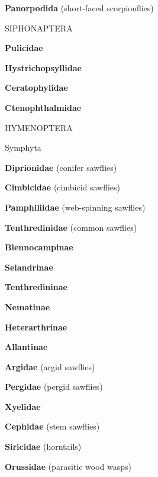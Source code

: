 \documentclass[letterpaper,10pt]{article}
\begin{document}
{\makebox[0.6cm]{}  \textbf{Panorpodida} (short-faced scorpionflies) \par
%
%
%
\makebox[0.0cm]{}  SIPHONAPTERA \par
\makebox[0.6cm]{}  \textbf{Pulicidae} \par
\makebox[0.6cm]{}  \textbf{Hystrichopsyllidae} \par
\makebox[0.6cm]{}  \textbf{Ceratophylidae} \par
\makebox[0.6cm]{}  \textbf{Ctenophthalmidae} \par
%
%
%	
\makebox[0.0cm]{}  HYMENOPTERA\par
\makebox[0.20cm]{}  Symphyta \par
\makebox[0.6cm]{}  \textbf{Diprionidae} (conifer sawflies) \par
\makebox[0.6cm]{}  \textbf{Cimbicidae} (cimbicid sawflies) \par
\makebox[0.6cm]{}  \textbf{Pamphiliidae} (web-spinning sawflies) \par
\makebox[0.6cm]{}  \textbf{Tenthredinidae} (common sawflies) \par
\makebox[0.8cm]{}  \textbf{Blennocampinae} \par
\makebox[0.8cm]{}  \textbf{Selandrinae} \par
\makebox[0.8cm]{}  \textbf{Tenthredininae} \par
\makebox[0.8cm]{}  \textbf{Nematinae} \par
\makebox[0.8cm]{}  \textbf{Heterarthrinae} \par
\makebox[0.8cm]{}  \textbf{Allantinae} \par
\makebox[0.6cm]{}  \textbf{Argidae} (argid sawflies) \par
\makebox[0.6cm]{}  \textbf{Pergidae} (pergid sawflies) \par
\makebox[0.6cm]{}  \textbf{Xyelidae} \par
\makebox[0.6cm]{}  \textbf{Cephidae} (stem sawflies) \par
\makebox[0.6cm]{}  \textbf{Siricidae} (horntails) \par
\makebox[0.6cm]{}  \textbf{Orussidae} (parasitic wood wasps) \par
}
\end{document}
